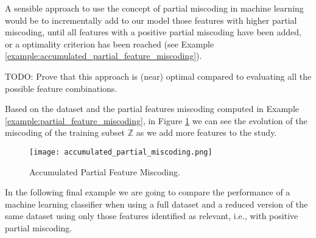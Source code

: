 A sensible approach to use the concept of partial miscoding in machine learning would be to incrementally add to our model those features with higher partial miscoding, until all features with a positive partial miscoding have been added, or a optimality criterion has been reached (see Example \ref{example:accumulated_partial_feature_miscoding}).

{\color{red} TODO: Prove that this approach is (near) optimal compared to evaluating all the possible feature combinations.}

\begin{example}
\label{example:accumulated_partial_feature_miscoding}
Based on the dataset and the partial features miscoding computed in Example \ref{example:partial_feature_miscoding}, in Figure \ref{figure:accumulated_partial_feature_miscoding} we can see the evolution of the miscoding of the training subset $\mathbb{Z}$ as we add more features to the study.

\begin{figure}[h]
\centering
\texttt{[image: accumulated\_partial\_miscoding.png]}
\caption{Accumulated Partial Feature Miscoding.}
\label{figure:accumulated_partial_feature_miscoding}
\end{figure}

\end{example}

In the following final example we are going to compare the performance of a machine learning classifier when using a full dataset and a reduced version of the same dataset using only those features identified as relevant, i.e., with positive partial miscoding.

